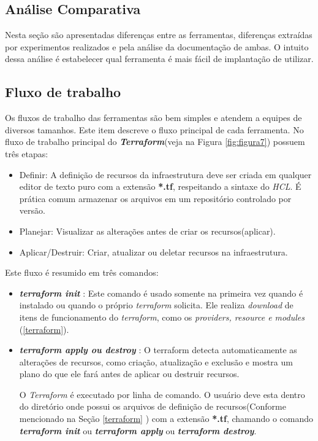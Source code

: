 \subsection{ Análise Comparativa }

Nesta seção são apresentadas diferenças entre as ferramentas, diferenças extraídas por experimentos realizados e pela análise da documentação de ambas. O intuito dessa análise é estabelecer qual ferramenta é mais fácil de implantação de utilizar.

\subsection{Fluxo de trabalho}
Os fluxos de trabalho  das ferramentas são bem simples e atendem a equipes de diversos tamanhos. Este item descreve o fluxo principal de cada ferramenta. No fluxo de trabalho principal do \textbf{\textit{Terraform}}(veja na Figura \ref{fig:figura7}) possuem três etapas: 

\begin{itemize}
  \item Definir: A definição de recursos da infraestrutura deve ser criada em qualquer editor de texto puro com a extensão \textbf{*.tf}, respeitando a sintaxe do \textit{HCL}. É prática comum armazenar os arquivos em um repositório controlado por versão.
   \item Planejar: Visualizar as alterações antes de criar os recursos(aplicar).
   \item Aplicar/Destruir: Criar, atualizar ou deletar recursos na infraestrutura. 
\end{itemize}


Este fluxo é resumido em três comandos: 


\begin{itemize}

\item \textbf{\textit{terraform init }}: Este comando é usado somente na primeira vez quando é instalado ou quando o próprio \textit{terraform} solicita. Ele realiza \textit{download} de itens de funcionamento do \textit{terraform}, como os \textit{providers, resource e modules} (\ref{terraform}). 

\item \textbf{\textit{terraform apply ou destroy }}: O terraform  detecta automaticamente as alterações de recursos, como criação, atualização e exclusão e mostra um plano do que ele fará antes de aplicar ou destruir recursos.

O \textit{Terraform} é executado por linha de comando. O usuário deve esta dentro do diretório onde possui os arquivos de definição de recursos(Conforme mencionado na Seção \ref{terraform} )  com a extensão \textbf{*.tf}, chamando o comando \textbf{\textit{terraform init}} ou \textbf{\textit{terraform apply}} ou \textbf{\textit{terraform destroy}}.  


\end{itemize}

